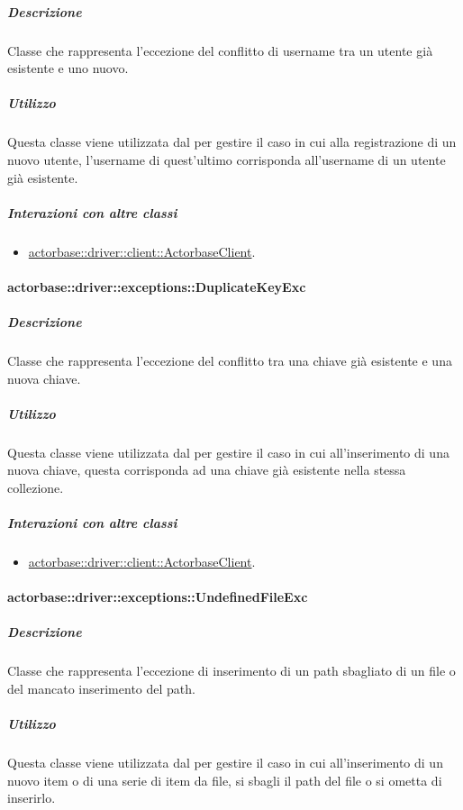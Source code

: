 \documentclass{scalatekids-article}
\begin{document}
\subparagraph{Descrizione}

Classe che rappresenta l'eccezione del conflitto di username tra un utente già esistente e uno nuovo.

\subparagraph{Utilizzo}

Questa classe viene utilizzata dal  per gestire il caso in cui alla registrazione di un nuovo utente, l'username di quest'ultimo corrisponda all'username di un utente già esistente.

\subparagraph{Interazioni con altre classi}

\begin{itemize}
	\item \hyperref[sec:actorbase::driver::client::ActorbaseClient]{actorbase::driver::client::ActorbaseClient}.
\end{itemize}

\paragraph{actorbase::driver::exceptions::DuplicateKeyExc}

\subparagraph{Descrizione}

Classe che rappresenta l'eccezione del conflitto tra una chiave già esistente e una nuova chiave.

\subparagraph{Utilizzo}

Questa classe viene utilizzata dal  per gestire il caso in cui all'inserimento di una nuova chiave, questa corrisponda ad una chiave già esistente nella stessa collezione.

\subparagraph{Interazioni con altre classi}

\begin{itemize}
	\item \hyperref[sec:actorbase::driver::client::ActorbaseClient]{actorbase::driver::client::ActorbaseClient}.
\end{itemize}

\paragraph{actorbase::driver::exceptions::UndefinedFileExc}

\subparagraph{Descrizione}

Classe che rappresenta l'eccezione di inserimento di un path sbagliato di un file o del mancato inserimento del path.

\subparagraph{Utilizzo}

Questa classe viene utilizzata dal  per gestire il caso in cui all'inserimento di un nuovo item o di una serie di item da file, si sbagli il path del file o si ometta di inserirlo.
\end{document}
